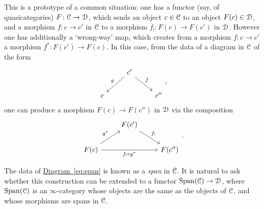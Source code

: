 \documentclass[main.tex]{subfiles}
\begin{document}
This is a prototype of a common situation: one has a functor (say, of quasicategories) $F\colon \mathcal{C} \to \mathcal{D}$, which sends an object $c \in \mathcal{C}$ to an object $F(c) \in \mathcal{D}$, and a morphism $f\colon c \to c'$ in $\mathcal{C}$ to a morphism $f_{!}\colon F(c) \to F(c')$ in $\mathcal{D}$. However one has additionally a `wrong-way' map, which creates from a morphism $f\colon c \to c'$ a morphism $f^{*}\colon F(c') \to F(c)$. In this case, from the data of a diagram in $\mathcal{C}$ of the form
\begin{equation}
  \label{eq:span}
  \begin{tikzcd}
    & c'
    \arrow[dl, swap, "g"]
    \arrow[dr, "f"]
    \\
    c
    && c''
  \end{tikzcd},
\end{equation}
one can produce a morphism $F(c) \to F(c'')$ in $\mathcal{D}$ via the composition
\begin{equation*}
  \begin{tikzcd}
    & F(c')
    \arrow[dr, "f_{!}"]
    \\
    F(c)
    \arrow[ur, "g^{*}"]
    \arrow[rr, swap, "f_{!} \circ g^{*}"]
    && F(c'')
  \end{tikzcd}.
\end{equation*}

The data of \hyperref[eq:span]{Diagram~\ref*{eq:span}} is known as a \emph{span} in $\mathcal{C}$. It is natural to ask whether this construction can be extended to a functor $\mathrm{Span}(\mathcal{C}) \to \mathcal{D}$, where $\mathrm{Span}(\mathcal{C})$ is an $\infty$-category whose objects are the same as the objects of $\mathcal{C}$, and whose morphisms are spans in $\mathcal{C}$.
\end{document}
